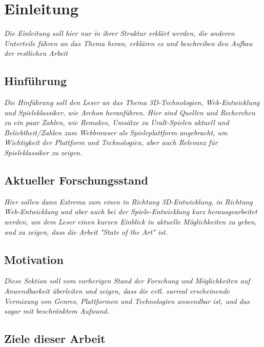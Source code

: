 \chapter{Einleitung}
\label{cha:Einleitung}

\emph{Die Einleitung soll hier nur in ihrer Struktur erkl\"art werden, die anderen Unterteile f\"uhren an das Thema heran, erkl\"aren es und beschreiben den Aufbau der restlichen Arbeit}

\section{Hinführung}
\label{sec:hinfuhrung}

\emph{Die Hinf\"uhrung soll den Leser an das Thema 3D-Technologien, Web-Entwicklung und Spieleklassiker, wie Archon heranführen. Hier sind Quellen und Recherchen zu ein paar Zahlen, wie Remakes, Umsätze zu Uralt-Spielen aktuell und Beliebtheit/Zahlen zum Webbrowser als Spieleplattform angebracht, um Wichtigkeit der Plattform und Technologien, aber auch Relevanz für Spieleklassiker zu zeigen.}

\section{Aktueller Forschungsstand}
\label{sec:aktueller_forschungsstand}

\emph{Hier sollen dann Extrema zum einen in Richtung 3D-Entwicklung, in Richtung Web-Entwicklung und aber auch bei der Spiele-Entwicklung kurz herausgearbeitet werden, um dem Leser einen kurzen Einblick in aktuelle M\"oglichkeiten zu geben, und zu zeigen, dass die Arbeit "State of the Art" ist. }

\section{Motivation}
\label{sec:motivation}
\emph{ Diese Sektion soll vom vorherigen Stand der Forschung und Möglichkeiten auf Anwendbarkeit überleiten und zeigen, dass die evtl. surreal erscheinende Vermixung von Genres, Plattformen und Technologien anwendbar ist, und das sogar mit beschränktem Aufwand. }

\section{Ziele dieser Arbeit}
\label{sec:ziele_dieser_arbeit}

